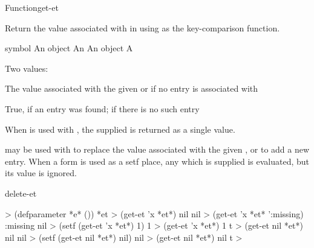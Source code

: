 \documentclass[10pt,twoside,english,pdftex]{article}
\begin{document}
\begin{functiondoc}{Function}{get-et}{
    }
%
  
\fnsyntax

\fnpurpose Return the value associated with  in  using
 as the key-comparison function.

\fnsetf
{}%
  {}

\fnpackage {}

\fnmodule {}

\fnargs
\begin{args}{symbol}
\arg[key] An object
\arg[et] An 
\arg[value] An object
\arg[present-p] A 
\end{args}

\fnreturns Two values:
\begin{tightitemize}
\item The value associated with the given  or  if no
  entry is associated with 
\item True, if an entry was found; \nil{} if there is no such entry
\end{tightitemize}
%
When  is used with , the supplied
 is returned as a single value.

\fndescription
%
 may be used with  to replace the
value associated with the given , or to add a new entry. When a
 form is used as a setf place, any
 which is supplied is evaluated, but its value is ignored.

\begin{alsos}{delete-et}
\also[make-et]
\also[assq]
\also[delete-et]
\end{alsos}

\fnexamples
{}%
%
\W\supp
\begin{example}
  > (defparameter *e* ())
  *et
  > (get-et 'x *et*)
  nil
  nil
  > (get-et 'x *et* ':missing)
  :missing
  nil
  > (setf (get-et 'x *et*) 1)
  1
  > (get-et 'x *et*)
  1
  t\goodpagebreak
  > (get-et nil *et*)
  nil
  nil
  > (setf (get-et nil *et*) nil)
  nil
  > (get-et nil *et*)
  nil
  t
  > 
\end{example}

\end{functiondoc}
\end{document}
